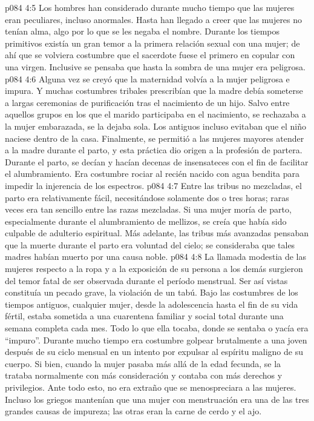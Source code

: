 \vs p084 4:5 Los hombres han considerado durante mucho tiempo que las mujeres eran peculiares, incluso anormales. Hasta han llegado a creer que las mujeres no tenían alma, algo por lo que se les negaba el nombre. Durante los tiempos primitivos existía un gran temor a la primera relación sexual con una mujer; de ahí que se volviera costumbre que el sacerdote fuese el primero en copular con una virgen. Inclusive se pensaba que hasta la sombra de una mujer era peligrosa.
\vs p084 4:6 Alguna vez se creyó que la maternidad volvía a la mujer peligrosa e impura. Y muchas costumbres tribales prescribían que la madre debía someterse a largas ceremonias de purificación tras el nacimiento de un hijo. Salvo entre aquellos grupos en los que el marido participaba en el nacimiento, se rechazaba a la mujer embarazada, se la dejaba sola. Los antiguos incluso evitaban que el niño naciese dentro de la casa. Finalmente, se permitió a las mujeres mayores atender a la madre durante el parto, y esta práctica dio origen a la profesión de partera. Durante el parto, se decían y hacían decenas de insensateces con el fin de facilitar el alumbramiento. Era costumbre rociar al recién nacido con agua bendita para impedir la injerencia de los espectros.
\vs p084 4:7 Entre las tribus no mezcladas, el parto era relativamente fácil, necesitándose solamente dos o tres horas; raras veces era tan sencillo entre las razas mezcladas. Si una mujer moría de parto, especialmente durante el alumbramiento de mellizos, se creía que había sido culpable de adulterio espiritual. Más adelante, las tribus más avanzadas pensaban que la muerte durante el parto era voluntad del cielo; se consideraba que tales madres habían muerto por una causa noble.
\vs p084 4:8 La llamada modestia de las mujeres respecto a la ropa y a la exposición de su persona a los demás surgieron del temor fatal de ser observada durante el período menstrual. Ser así vistas constituía un pecado grave, la violación de un tabú. Bajo las costumbres de los tiempos antiguos, cualquier mujer, desde la adolescencia hasta el fin de su vida fértil, estaba sometida a una cuarentena familiar y social total durante una semana completa cada mes. Todo lo que ella tocaba, donde se sentaba o yacía era “impuro”. Durante mucho tiempo era costumbre golpear brutalmente a una joven después de su ciclo mensual en un intento por expulsar al espíritu maligno de su cuerpo. Si bien, cuando la mujer pasaba más allá de la edad fecunda, se la trataba normalmente con más consideración y contaba con más derechos y privilegios. Ante todo esto, no era extraño que se menospreciara a las mujeres. Incluso los griegos mantenían que una mujer con menstruación era una de las tres grandes causas de impureza; las otras eran la carne de cerdo y el ajo.
